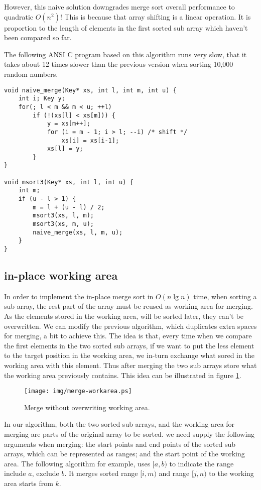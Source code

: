 \documentclass[UTF8]{article}
\begin{document}
However, this naive solution downgrades merge sort overall performance to quadratic $O(n^2)$! This is because
that array shifting is a linear operation. It is proportion to the length of elements in
the first sorted sub array which haven't been compared so far.

The following ANSI C program based on this algorithm runs very slow, that it takes about 12 times slower than
the previous version when sorting 10,000 random numbers.

\lstset{language=C}
\begin{lstlisting}
void naive_merge(Key* xs, int l, int m, int u) {
    int i; Key y;
    for(; l < m && m < u; ++l)
        if (!(xs[l] < xs[m])) {
            y = xs[m++];
            for (i = m - 1; i > l; --i) /* shift */
                xs[i] = xs[i-1];
            xs[l] = y;
        }
}

void msort3(Key* xs, int l, int u) {
    int m;
    if (u - l > 1) {
        m = l + (u - l) / 2;
        msort3(xs, l, m);
        msort3(xs, m, u);
        naive_merge(xs, l, m, u);
    }
}
\end{lstlisting}

\subsection{in-place working area}
In order to implement the in-place merge sort in $O(n \lg n)$ time, when sorting a sub array, the rest part of
the array must be reused as working area for merging. As the elements stored in the working area, will be sorted
later, they can't be overwritten. We can modify the previous algorithm, which duplicates extra spaces for merging,
a bit to achieve this. The idea is that, every time when we compare the first elements in the two sorted sub
arrays, if we want to put the less element to the target position in the working area, we in-turn exchange what
sored in the working area with this element. Thus after merging the two sub arrays store what the working area
previously contains. This idea can be illustrated in figure \ref{fig:merge-workarea}.

\begin{figure}[htbp]
 \centering
 \texttt{[image: img/merge-workarea.ps]}
 \caption{Merge without overwriting working area.}
 \label{fig:merge-workarea}
\end{figure}

In our algorithm, both the two sorted sub arrays, and the working area for merging are parts of the
original array to be sorted. we need supply the following arguments when merging: the start points and end
points of the sorted sub arrays, which can be represented as ranges; and the start point of the working
area. The following algorithm for example, uses $[a, b)$ to indicate the range include $a$,
exclude $b$. It merges sorted range $[i, m)$ and range $[j, n)$ to the working area starts from $k$.
\end{document}
